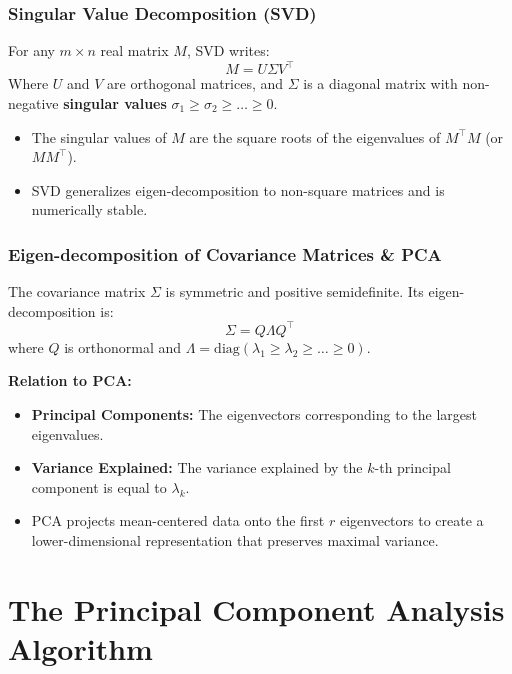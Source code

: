 \documentclass[12pt, a4paper]{report}
\begin{document}
\subsection{Singular Value Decomposition (SVD)}
For any $m \times n$ real matrix $M$, SVD writes:
\begin{equation}
    M = U \Sigma V^\top
\end{equation}
Where $U$ and $V$ are orthogonal matrices, and $\Sigma$ is a diagonal matrix with non-negative \textbf{singular values} $\sigma_1 \geq \sigma_2 \geq \dots \geq 0$.
\begin{itemize}
    \item The singular values of $M$ are the square roots of the eigenvalues of $M^\top M$ (or $MM^\top$).
    \item SVD generalizes eigen-decomposition to non-square matrices and is numerically stable.
\end{itemize}

\subsection{Eigen-decomposition of Covariance Matrices \& PCA}
The covariance matrix $\Sigma$ is symmetric and positive semidefinite. Its eigen-decomposition is:
\begin{equation}
    \Sigma = Q \Lambda Q^\top
\end{equation}
where $Q$ is orthonormal and $\Lambda = \text{diag}(\lambda_1 \geq \lambda_2 \geq \dots \geq 0)$.

\textbf{Relation to PCA:}
\begin{itemize}
    \item \textbf{Principal Components:} The eigenvectors corresponding to the largest eigenvalues.
    \item \textbf{Variance Explained:} The variance explained by the $k$-th principal component is equal to $\lambda_k$.
    \item PCA projects mean-centered data onto the first $r$ eigenvectors to create a lower-dimensional representation that preserves maximal variance.
\end{itemize}

\newpage
\chapter{The Principal Component Analysis Algorithm}
\end{document}
